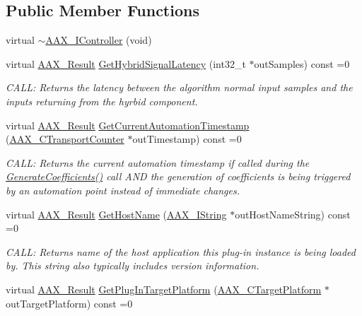 \subsection*{Public Member Functions}
\begin{DoxyCompactItemize}
\item 
virtual \hyperlink{a00090_aa8dee55f260a0f92f29b95f9d7acc9dd}{$\sim$\+A\+A\+X\+\_\+\+I\+Controller} (void)
\item 
virtual \hyperlink{a00149_a4d8f69a697df7f70c3a8e9b8ee130d2f}{A\+A\+X\+\_\+\+Result} \hyperlink{a00335_ga47b471c438fcad0798964b860d74609e}{Get\+Hybrid\+Signal\+Latency} (int32\+\_\+t $\ast$out\+Samples) const =0
\begin{DoxyCompactList}\small\item\em C\+A\+L\+L\+: Returns the latency between the algorithm normal input samples and the inputs returning from the hyrbid component. \end{DoxyCompactList}\item 
virtual \hyperlink{a00149_a4d8f69a697df7f70c3a8e9b8ee130d2f}{A\+A\+X\+\_\+\+Result} \hyperlink{a00090_af9ab9b228023e116f89249a56c27a20f}{Get\+Current\+Automation\+Timestamp} (\hyperlink{a00149_ac09cd6857748cc296ac0f8bcc20dc74b}{A\+A\+X\+\_\+\+C\+Transport\+Counter} $\ast$out\+Timestamp) const =0
\begin{DoxyCompactList}\small\item\em C\+A\+L\+L\+: Returns the current automation timestamp if called during the \hyperlink{a00061_a083265b008921b6114ede387711694b7}{Generate\+Coefficients()} call A\+N\+D the generation of coefficients is being triggered by an automation point instead of immediate changes. \end{DoxyCompactList}\item 
virtual \hyperlink{a00149_a4d8f69a697df7f70c3a8e9b8ee130d2f}{A\+A\+X\+\_\+\+Result} \hyperlink{a00090_ad2a002a133491b2ed572054588641e78}{Get\+Host\+Name} (\hyperlink{a00113}{A\+A\+X\+\_\+\+I\+String} $\ast$out\+Host\+Name\+String) const =0
\begin{DoxyCompactList}\small\item\em C\+A\+L\+L\+: Returns name of the host application this plug-\/in instance is being loaded by. This string also typically includes version information. \end{DoxyCompactList}\item 
virtual \hyperlink{a00149_a4d8f69a697df7f70c3a8e9b8ee130d2f}{A\+A\+X\+\_\+\+Result} \hyperlink{a00090_a8326b2acec2d9c9039853adafd9b2bef}{Get\+Plug\+In\+Target\+Platform} (\hyperlink{a00149_a8f2cefa455217fa9f3ce190fe5fd8033}{A\+A\+X\+\_\+\+C\+Target\+Platform} $\ast$out\+Target\+Platform) const =0

\end{DoxyCompactItemize}
